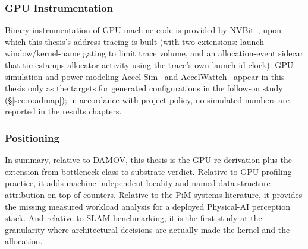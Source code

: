 \subsubsection{GPU Instrumentation}

Binary instrumentation of GPU machine code is provided by NVBit~\cite{villa2019nvbit}, upon which this thesis's address tracing is built (with two extensions: launch-window/kernel-name gating to limit trace volume, and an allocation-event sidecar that timestamps allocator activity using the trace's own launch-id clock). GPU simulation and power modeling Accel-Sim~\cite{khairy2020accelsim} and AccelWattch~\cite{kandiah2021accelwattch} appear in this thesis only as the targets for generated configurations in the follow-on study (\S\ref{sec:roadmap}); in accordance with project policy, no simulated numbers are reported in the results chapters.

\subsubsection{Positioning}

In summary, relative to DAMOV, this thesis is the GPU re-derivation plus the extension from bottleneck class to substrate verdict. Relative to GPU profiling practice, it adds machine-independent locality and named data-structure attribution on top of counters. Relative to the PiM systems literature, it provides the missing measured workload analysis for a deployed Physical-AI perception stack. And relative to SLAM benchmarking, it is the first study at the granularity where architectural decisions are actually made the kernel and the allocation.
